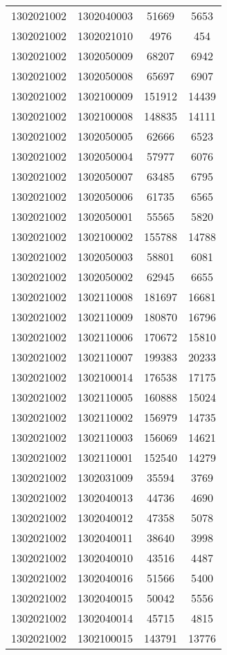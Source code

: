 \begin{longtable}{llcc}
1302021002 & 1302040003 & 51669 & 5653\\
1302021002 & 1302021010 & 4976 & 454\\
1302021002 & 1302050009 & 68207 & 6942\\
1302021002 & 1302050008 & 65697 & 6907\\
1302021002 & 1302100009 & 151912 & 14439\\
1302021002 & 1302100008 & 148835 & 14111\\
1302021002 & 1302050005 & 62666 & 6523\\
1302021002 & 1302050004 & 57977 & 6076\\
1302021002 & 1302050007 & 63485 & 6795\\
1302021002 & 1302050006 & 61735 & 6565\\
1302021002 & 1302050001 & 55565 & 5820\\
1302021002 & 1302100002 & 155788 & 14788\\
1302021002 & 1302050003 & 58801 & 6081\\
1302021002 & 1302050002 & 62945 & 6655\\
1302021002 & 1302110008 & 181697 & 16681\\
1302021002 & 1302110009 & 180870 & 16796\\
1302021002 & 1302110006 & 170672 & 15810\\
1302021002 & 1302110007 & 199383 & 20233\\
1302021002 & 1302100014 & 176538 & 17175\\
1302021002 & 1302110005 & 160888 & 15024\\
1302021002 & 1302110002 & 156979 & 14735\\
1302021002 & 1302110003 & 156069 & 14621\\
1302021002 & 1302110001 & 152540 & 14279\\
1302021002 & 1302031009 & 35594 & 3769\\
1302021002 & 1302040013 & 44736 & 4690\\
1302021002 & 1302040012 & 47358 & 5078\\
1302021002 & 1302040011 & 38640 & 3998\\
1302021002 & 1302040010 & 43516 & 4487\\
1302021002 & 1302040016 & 51566 & 5400\\
1302021002 & 1302040015 & 50042 & 5556\\
1302021002 & 1302040014 & 45715 & 4815\\
1302021002 & 1302100015 & 143791 & 13776\\

\end{longtable}
